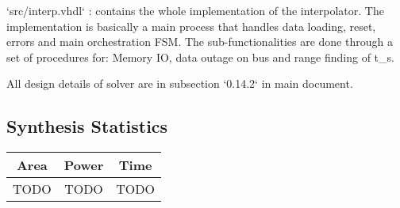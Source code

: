 \documentclass[12pt]{report}
\begin{document}
    `src/interp.vhdl` : contains the whole implementation of the interpolator. The implementation is basically a main process that handles data loading, reset, errors and main orchestration FSM. The sub-functionalities are done through a set of procedures for: Memory IO, data outage on bus and range finding of t\_s.

    All design details of solver are in subsection `0.14.2` in main document. 
    \subsection{Synthesis Statistics}
    \begin{tabular}{||c|c|c||}
        \hline
        Area & Power & Time\\\hline\hline
        TODO & TODO & TODO\\\hline
    \end{tabular}
\end{document}
